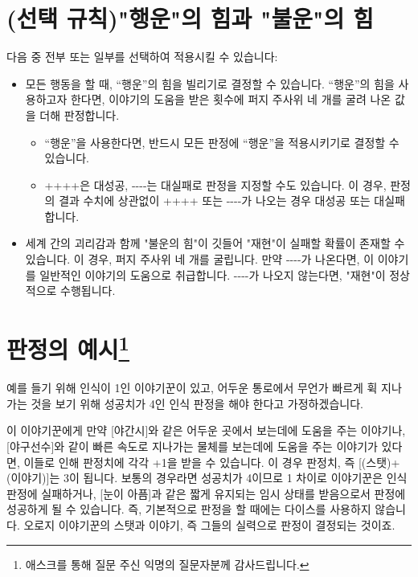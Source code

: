 \documentclass[12pt]{report}
\begin{document}
	\section*{(선택 규칙)"행운"의 힘과 "불운"의 힘}
	다음 중 전부 또는 일부를 선택하여 적용시킬 수 있습니다:
	\begin{itemize}
		\item 모든 행동을 할 때, “행운”의 힘을 빌리기로 결정할 수 있습니다. “행운”의 힘을 사용하고자 한다면, 이야기의 도움을 받은 횟수에 퍼지 주사위 네 개를 굴려 나온 값을 더해 판정합니다.
		
		\begin{itemize}
			\item “행운”을 사용한다면, 반드시 모든 판정에 “행운”을 적용시키기로 결정할 수 있습니다.
		
			\item ++++은 대성공, -{}-{}-{}-는 대실패로 판정을 지정할 수도 있습니다. 이 경우, 판정의 결과 수치에 상관없이 ++++ 또는 -{}-{}-{}-가 나오는 경우 대성공 또는 대실패합니다.
		\end{itemize}
		
		\item 세계 간의 괴리감과 함께 "불운의 힘"이 깃들어 "재현"이 실패할 확률이 존재할 수 있습니다. 이 경우, 퍼지 주사위 네 개를 굴립니다. 만약 -{}-{}-{}-가 나온다면, 이 이야기를 일반적인 이야기의 도움으로 취급합니다. -{}-{}-{}-가 나오지 않는다면, "재현"이 정상적으로 수행됩니다.
	\end{itemize}
	
	\section*{판정의 예시\footnote{애스크를 통해 질문 주신 익명의 질문자분께 감사드립니다.}}
	
	예를 들기 위해 인식이 1인 이야기꾼이 있고, 어두운 통로에서 무언가 빠르게 휙 지나가는 것을 보기 위해 성공치가 4인 인식 판정을 해야 한다고 가정하겠습니다.
	
	이 이야기꾼에게 만약 [야간시]와 같은 어두운 곳에서 보는데에 도움을 주는 이야기나, [야구선수]와 같이 빠른 속도로 지나가는 물체를 보는데에 도움을 주는 이야기가 있다면, 이들로 인해 판정치에 각각 +1을 받을 수 있습니다. 이 경우 판정치, 즉 [(스탯)+(이야기)]는 3이 됩니다. 보통의 경우라면 성공치가 4이므로 1 차이로 이야기꾼은 인식 판정에 실패하거나, [눈이 아픔]과 같은 짧게 유지되는 임시 상태를 받음으로서 판정에 성공하게 될 수 있습니다. 즉, 기본적으로 판정을 할 때에는 다이스를 사용하지 않습니다. 오로지 이야기꾼의 스탯과 이야기, 즉 그들의 실력으로 판정이 결정되는 것이죠.
	
\end{document}

